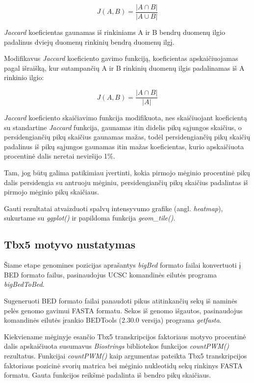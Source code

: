 \documentclass[12pt]{article}
\begin{document}
                \[ J(A, B) =  \frac{|A \cap B|}{|A \cup B|} \]

\emph{Jaccard} koeficientas gaunamas iš rinkiniams A ir B bendrų duomenų ilgio
padalinus dviejų duomenų rinkinių bendrą duomenų ilgį.

Modifikavus \emph{Jaccard} koeficiento gavimo funkciją, koeficientas
apskaičiuojamas pagal išraišką, kur sutampančių A ir B rinkinių duomenų ilgis
padalinamas iš A rinkinio ilgio:

                    \[ J(A, B) = \frac{|A \cap B|}{|A|} \]

\emph{Jaccard} koeficiento skaičiavimo funkcija modifikuota, nes skaičiuojant
koeficientą su standartine \emph{Jaccard} funkcija, gaunamas itin didelis
pikų sąjungos skaičius, o persidengiančių pikų skaičius gaunamas mažas,
todėl persidengiančių pikų skaičių padalinus iš pikų sąjungos gaunamas
itin mažas koeficientas, kurio apskaičiuota procentinė dalis neretai neviršijo
1\%.

Tam, jog būtų galima patikimiau įvertinti, kokia pirmojo mėginio procentinė
pikų dalis persidengia su antruoju mėginiu, persidengiančių pikų skaičius
padalintas iš pirmojo mėginio pikų skaičiaus.

Gauti rezultatai atvaizduoti spalvų intensyvumo grafike (angl. \emph{heatmap}),
sukurtame su \emph{ggplot()} ir papildoma funkcija \emph{geom\_tile()}.

\subsection{Tbx5 motyvo nustatymas}
Šiame etape genomines pozicijas aprašantys \emph{bigBed} formato failai
konvertuoti į BED formato failus, pasinaudojus UCSC komandinės eilutės programa
\emph{bigBedToBed}\cite{BBTOBED}.

Sugeneruoti BED formato failai panaudoti pikus atitinkančių sekų iš naminės
pelės genomo gavimui FASTA formatu. Sekos iš genomo išgautos, pasinaudojus
komandinės eilutės įrankio BEDTools\cite{BEDTOOLS} (2.30.0 versija) programa
\emph{getfasta}\cite{GET_FASTA}.

Kiekviename mėginyje esančio Tbx5 transkripcijos faktoriaus motyvo procentinė
dalis apskaičiuota susumavus \emph{Biostrings}\cite{BIOSTR} bibliotekos
funkcijos \emph{countPWM()} rezultatus. Funkcijai \emph{countPWM()} kaip
argumentas pateikta Tbx5 transkripcijos faktoriaus pozicinė svorių matrica bei
mėginio nukleotidų sekų rinkinys FASTA formatu. Gauta funkcijos reikšmė
padalinta iš bendro pikų skaičiaus.
\end{document}
